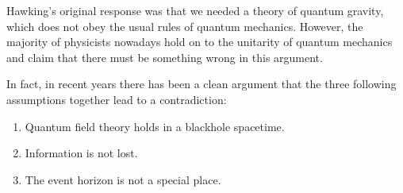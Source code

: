 Hawking's original response was that we needed a theory of quantum gravity, which does not obey the usual rules of quantum mechanics. However, the majority of physicists nowadays hold on to the unitarity of quantum mechanics and claim that there must be something wrong in this argument.

In fact, in recent years there has been a clean argument that the three following assumptions together lead to a contradiction:
\begin{enumerate}[1.]
  \item Quantum field theory holds in a blackhole spacetime.
  \item Information is not lost.
  \item The event horizon is not a special place.
\end{enumerate}
